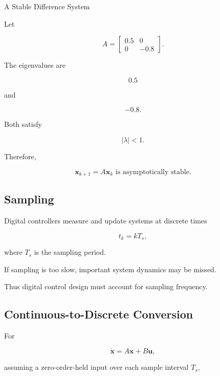 \begin{workedexamplebox}{A Stable Difference System}

Let

\[
A
=
\begin{bmatrix}
0.5 & 0\\
0 & -0.8
\end{bmatrix}.
\]

The eigenvalues are

\[
0.5
\]

and

\[
-0.8.
\]

Both satisfy

\[
|\lambda|<1.
\]

Therefore,

\begin{answerbox}
\[
\boxed{
\mathbf{x}_{k+1}=A\mathbf{x}_k
\text{ is asymptotically stable}.
}
\]
\end{answerbox}

\end{workedexamplebox}

\subsection{Sampling}
\label{subsec:control-sampling}

Digital controllers measure and update systems at discrete times

\[
\boxed{
t_k=kT_s,
}
\]

where \(T_s\) is the sampling period.

If sampling is too slow, important system dynamics may be missed.

Thus digital control design must account for sampling frequency.

\subsection{Continuous-to-Discrete Conversion}
\label{subsec:continuous-discrete-control-conversion}

For

\[
\dot{\mathbf{x}}
=
A\mathbf{x}
+
B\mathbf{u},
\]

assuming a zero-order-held input over each sample interval \(T_s\),

